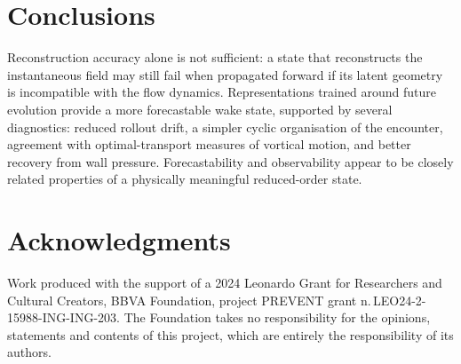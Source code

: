 \documentclass[10]{edrfcm}
\begin{document}
\section{Conclusions}

Reconstruction accuracy alone is not sufficient: a state that reconstructs the
instantaneous field may still fail when propagated forward if its latent geometry
is incompatible with the flow dynamics. Representations trained around future
evolution provide a more forecastable wake state, supported by several
diagnostics: reduced rollout drift, a simpler cyclic organisation of the
encounter, agreement with optimal-transport measures of vortical motion, and
better recovery from wall pressure. Forecastability and observability appear to be
closely related properties of a physically meaningful reduced-order state.


\section{Acknowledgments}

Work produced with the support of a 2024 Leonardo Grant for Researchers and
Cultural Creators, BBVA Foundation, project PREVENT grant
n.\,LEO24-2-15988-ING-ING-203. The Foundation takes no responsibility for the
opinions, statements and contents of this project, which are entirely the
responsibility of its authors.



\end{document}
